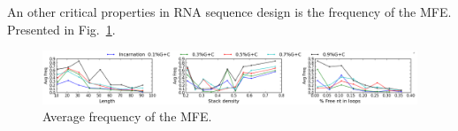 An other critical properties in RNA sequence design is the frequency of
the MFE. Presented in Fig.~\ref{fig:freq}.

\begin{figure}[ht!]
	\centering
	\includegraphics[scale=0.45]{Figures/freq.png}
	\caption{Average frequency of the MFE.}
	\label{fig:freq}
\end{figure}

